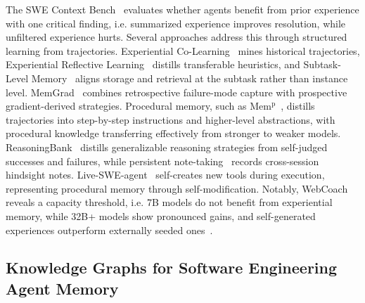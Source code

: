 \documentclass[runningheads]{llncs}
\begin{document}
The SWE Context Bench~\cite{zhu2026} evaluates whether agents benefit from prior experience with one critical finding, i.e. summarized experience improves resolution, while unfiltered experience hurts. Several approaches address this through structured learning from trajectories. Experiential Co-Learning~\cite{qian2024} mines historical trajectories, Experiential Reflective Learning~\cite{erl2026} distills transferable heuristics, and Subtask-Level Memory~\cite{subtaskmem2026} aligns storage and retrieval at the subtask rather than instance level. MemGrad~\cite{memgrad2026} combines retrospective failure-mode capture with prospective gradient-derived strategies.
Procedural memory, such as Mem$^{\mathrm{p}}$~\cite{memp2025}, distills trajectories into step-by-step instructions and higher-level abstractions, with procedural knowledge transferring effectively from stronger to weaker models. ReasoningBank~\cite{reasoningbank2025} distills generalizable reasoning strategies from self-judged successes and failures, while persistent note-taking~\cite{cca2025} records cross-session hindsight notes. Live-SWE-agent~\cite{xia2025} self-creates new tools during execution, representing procedural memory through self-modification.
Notably, WebCoach~\cite{webcoach2026} reveals a capacity threshold, i.e. 7B models do not benefit from experiential memory, while 32B+ models show pronounced gains, and self-generated experiences outperform externally seeded ones~\cite{erl2026}.


\subsection{Knowledge Graphs for Software Engineering Agent Memory}
\end{document}
